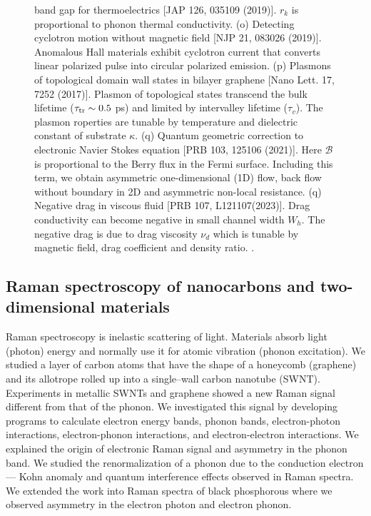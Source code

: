 \documentclass[a4paper,11pt]{article}
\begin{document}
\begin{figure}[h!]
{    band gap for thermoelectrics [JAP 126, 035109 (2019)]. $r_k$ is
    proportional to phonon thermal conductivity. (o) Detecting
    cyclotron motion without magnetic field [NJP 21, 083026
      (2019)]. Anomalous Hall materials exhibit cyclotron current that
    converts linear polarized pulse into circular polarized
    emission. (p) Plasmons of topological domain wall states in
    bilayer graphene [Nano Lett. 17, 7252 (2017)]. Plasmon of
    topological states transcend the bulk lifetime ($\tau_{\rm tr}\sim
    0.5$ ps) and limited by intervalley lifetime ($\tau_v$). The
    plasmon roperties are tunable by temperature and dielectric
    constant of substrate $\kappa$. (q) Quantum geometric correction
    to electronic Navier Stokes equation [PRB 103, 125106
      (2021)]. Here $\boldsymbol{\mathcal{B}}$ is proportional to the
    Berry flux in the Fermi surface. Including this term, we obtain
    asymmetric one-dimensional (1D) flow, back flow without boundary
    in 2D and asymmetric non-local resistance. (q) Negative drag in
    viscous fluid [PRB 107, L121107(2023)]. Drag conductivity can
    become negative in small channel width $W_h$. The negative drag is
    due to drag viscosity $\nu_d$ which is tunable by magnetic field,
    drag coefficient and density ratio. . }

\label{summary of past research}
\end{figure}

\subsection*{Raman spectroscopy of nanocarbons and two-dimensional materials}
Raman spectroscopy is inelastic scattering of light. Materials absorb
light (photon) energy and normally use it for atomic vibration (phonon
excitation). We studied a layer of carbon atoms that have the shape of a
honeycomb (graphene) and its allotrope rolled up into a single--wall carbon nanotube (SWNT).  Experiments in metallic SWNTs and
graphene showed a new Raman signal different from that of the phonon.  We
investigated this signal by developing programs to calculate electron
energy bands, phonon bands, electron-photon interactions,
electron-phonon interactions, and electron-electron interactions. We
explained the origin of electronic Raman signal and asymmetry in the
phonon band. We studied the renormalization of a phonon due to the conduction
electron --- Kohn anomaly and quantum interference effects observed in
Raman spectra. We extended the work into Raman spectra of black
phosphorous where we observed asymmetry in the electron photon and electron phonon.
\end{document}
